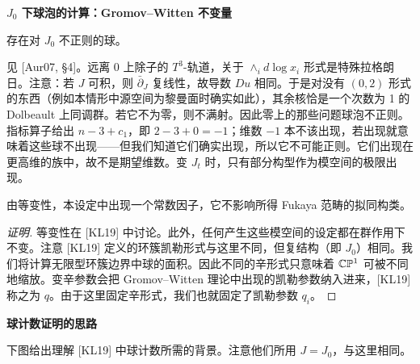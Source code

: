 \medskip\noindent\textbf{$J_0$ 下球泡的计算：Gromov--Witten 不变量}\par
\begin{claim}\label{claim:nonregular-spheres}
存在对 $J_0$ 不正则的球。
\end{claim}

见 [Aur07, §4]。远离 0 上除子的 $T^3$-轨道，关于 $\wedge_i d\log x_i$ 形式是特殊拉格朗日。注意：若 $J$ 可积，则 $\bar\partial_J$ 复线性，故导数 $Du$ 相同。于是对没有 $(0,2)$ 形式的东西（例如本情形中源空间为黎曼面时确实如此），其余核恰是一个次数为 1 的 Dolbeault 上同调群。若它不为零，则不满射。因此零上的那些问题球泡不正则。指标算子给出 $n-3+c_1$，即 $2-3+0=-1$；维数 $-1$ 本不该出现，若出现就意味着这些球不出现——但我们知道它们确实出现，所以它不可能正则。它们出现在更高维的族中，故不是期望维数。变 $J_t$ 时，只有部分构型作为模空间的极限出现。

\begin{corollary}\label{cor:equivariance}
由等变性，本设定中出现一个常数因子，它不影响所得 Fukaya 范畴的拟同构类。
\end{corollary}

\begin{proof}[证明]
等变性在 [KL19] 中讨论。此外，任何产生这些模空间的设定都在群作用下不变。注意 [KL19] 定义的环簇凯勒形式与这里不同，但复结构（即 $J_0$）相同。我们将计算无限型环簇边界中球的面积。因此不同的辛形式只意味着 $\mathbb{C}\mathbb{P}^1$ 可被不同地缩放。变辛参数会把 Gromov--Witten 理论中出现的凯勒参数纳入进来，[KL19] 称之为 $q$。由于这里固定辛形式，我们也就固定了凯勒参数 $q_i$。
\end{proof}

\medskip\noindent\textbf{球计数证明的思路}\par
下图给出理解 [KL19] 中球计数所需的背景。注意他们所用 $J=J_0$，与这里相同。

\begin{center}
\end{center}

